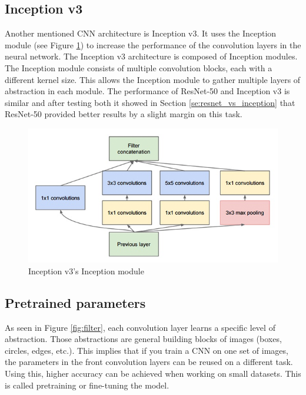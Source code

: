 \documentclass[times, utf8, diplomski]{fer}
\begin{document}
\subsection{Inception v3} 
\label{se:inceptionv3_architecture}

Another mentioned CNN architecture is Inception v3. It uses the Inception module (see Figure \ref{fig:inception_module}) to increase the performance of the convolution layers in the neural network. The Inception v3 architecture is composed of Inception modules. The Inception module consists of multiple convolution blocks, each with a different kernel size. This allows the Inception module to gather multiple layers of abstraction in each module. The performance of ResNet-50 and Inception v3 is similar and after testing both it showed in Section \ref{se:resnet_vs_inception} that  ResNet-50 provided better results by a slight margin on this task.

\begin{figure}
  \includegraphics[scale=0.7]{figures/inception_module.png}
  \centering
  \caption{Inception v3's Inception module}
  \label{fig:inception_module}
\end{figure}


\subsection{Pretrained parameters}
\label{se:pretrained_parameters}
As seen in Figure \ref{fig:filter}, each convolution layer learns a specific level of abstraction. Those abstractions are general building blocks of images (boxes, circles, edges, etc.). This implies that if you train a CNN on one set of images, the parameters in the front convolution layers can be reused on a different task. Using this, higher accuracy can be achieved when working on small datasets. This is called pretraining or fine-tuning the model.
\end{document}
